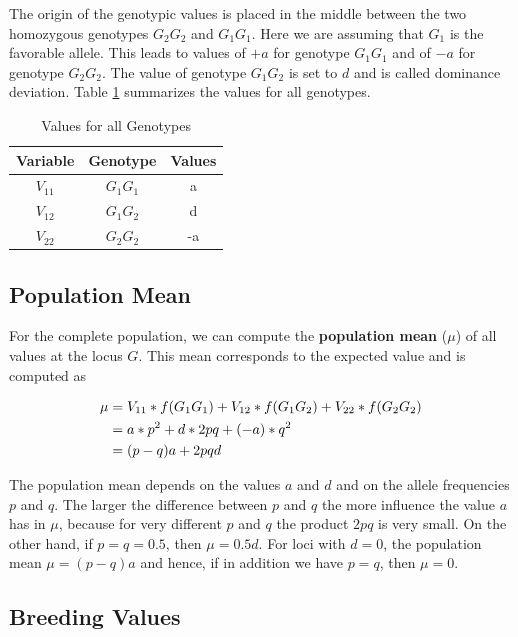 \documentclass[
]{book}
\theoremstyle{definition}
\theoremstyle{definition}
\theoremstyle{definition}
\theoremstyle{remark}
\begin{document}
The origin of the genotypic values is placed in the middle between the two homozygous genotypes \(G_2G_2\) and \(G_1G_1\). Here we are assuming that \(G_1\) is the favorable allele. This leads to values of \(+a\) for genotype \(G_1G_1\) and of \(-a\) for genotype \(G_2G_2\). The value of genotype \(G_1G_2\) is set to \(d\) and is called dominance deviation. Table \ref{tab:tabsumgenvalue} summarizes the values for all genotypes.

\begin{table}

\caption{\label{tab:tabsumgenvalue}Values for all Genotypes}
\centering
\begin{tabular}[t]{ccc}
\toprule
Variable & Genotype & Values\\
\midrule
$V_{11}$ & $G_1G_1$ & a\\
$V_{12}$ & $G_1G_2$ & d\\
$V_{22}$ & $G_2G_2$ & -a\\
\bottomrule
\end{tabular}
\end{table}

\hypertarget{pop-mean}{%
\subsection{Population Mean}\label{pop-mean}}

For the complete population, we can compute the \textbf{population mean} (\(\mu\)) of all values at the locus \(G\). This mean corresponds to the expected value and is computed as

\begin{align}
\mu &= V_{11} * f(G_1G_1) + V_{12} * f(G_1G_2) + V_{22} * f(G_2G_2) \notag \\
    &= a * p^2 + d *2pq + (-a) * q^2 \notag \\
    &= (p-q)a + 2pqd
\label{eq:popmean}
\end{align}

The population mean depends on the values \(a\) and \(d\) and on the allele frequencies \(p\) and \(q\). The larger the difference between \(p\) and \(q\) the more influence the value \(a\) has in \(\mu\), because for very different \(p\) and \(q\) the product \(2pq\) is very small. On the other hand, if \(p=q=0.5\), then \(\mu = 0.5d\). For loci with \(d=0\), the population mean \(\mu = (p-q)a\) and hence, if in addition we have \(p=q\), then \(\mu=0\).

\hypertarget{breed-value}{%
\subsection{Breeding Values}\label{breed-value}}
\end{document}
